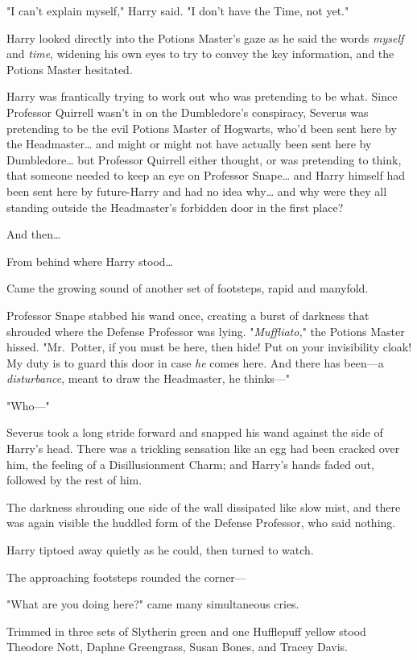 "I can't explain myself," Harry said. "I don't have the Time, not yet."

Harry looked directly into the Potions Master's gaze as he said the words 
\emph{myself} and \emph{time}, widening his own eyes to try to convey the key 
information, and the Potions Master hesitated.

Harry was frantically trying to work out who was pretending to be what. Since 
Professor Quirrell wasn't in on the Dumbledore's conspiracy, Severus was 
pretending to be the evil Potions Master of Hogwarts, who'd been sent here by 
the Headmaster{\ldots} and might or might not have actually been sent here by 
Dumbledore{\ldots} but Professor Quirrell either thought, or was pretending to 
think, that someone needed to keep an eye on Professor Snape{\ldots} and Harry 
himself had been sent here by future-Harry and had no idea why{\ldots} and why 
were they all standing outside the Headmaster's forbidden door in the first 
place?

And then{\ldots}

From behind where Harry stood{\ldots}

Came the growing sound of another set of footsteps, rapid and manyfold.

Professor Snape stabbed his wand once, creating a burst of darkness that 
shrouded where the Defense Professor was lying. "\emph{Muffliato,}" the Potions 
Master hissed. "Mr.~Potter, if you must be here, then hide! Put on your 
invisibility cloak! My duty is to guard this door in case \emph{he} comes here. 
And there has been---a \emph{disturbance}, meant to draw the Headmaster, he 
thinks---"

"Who---"

Severus took a long stride forward and snapped his wand against the side of 
Harry's head. There was a trickling sensation like an egg had been cracked over 
him, the feeling of a Disillusionment Charm; and Harry's hands faded out, 
followed by the rest of him.

The darkness shrouding one side of the wall dissipated like slow mist, and 
there was again visible the huddled form of the Defense Professor, who said 
nothing.

Harry tiptoed away quietly as he could, then turned to watch.

The approaching footsteps rounded the corner---

"What are you doing here?" came many simultaneous cries.

Trimmed in three sets of Slytherin green and one Hufflepuff yellow stood 
Theodore Nott, Daphne Greengrass, Susan Bones, and Tracey Davis.

